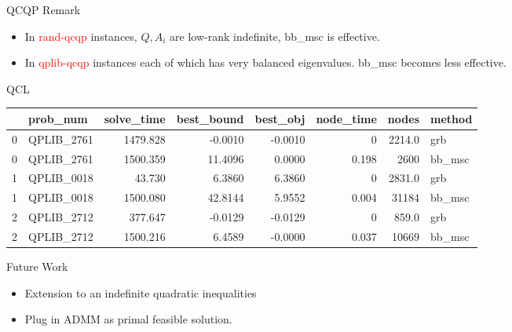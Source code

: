 \documentclass[aspectratio=1610, 9pt]{beamer}
\newcommand{\redsf}[1]{\textcolor{red}{\textsf{#1}}}
\begin{document}
\begin{frame}[standout]{QCQP}
  \normalsize
  Remark
  \begin{itemize}
    \item In \redsf{rand-qcqp} instances, \(Q, A_i\) are low-rank indefinite, bb\_msc is effective.
    \item In \redsf{qplib-qcqp} instances each of which has very balanced eigenvalues. bb\_msc becomes less effective.
  \end{itemize}
\end{frame}

\begin{frame}[standout]{QCL}
  \begin{tabular}{llrrrrrl}
    \toprule
    {} & prob\_num   & solve\_time & best\_bound & best\_obj & node\_time & nodes  & method  \\
    \midrule
    0  & QPLIB\_2761 & 1479.828    & -0.0010     & -0.0010   & 0          & 2214.0 & grb     \\
    0  & QPLIB\_2761 & 1500.359    & 11.4096     & 0.0000    & 0.198      & 2600   & bb\_msc \\
    1  & QPLIB\_0018 & 43.730      & 6.3860      & 6.3860    & 0          & 2831.0 & grb     \\
    1  & QPLIB\_0018 & 1500.080    & 42.8144     & 5.9552    & 0.004      & 31184  & bb\_msc \\
    2  & QPLIB\_2712 & 377.647     & -0.0129     & -0.0129   & 0          & 859.0  & grb     \\
    2  & QPLIB\_2712 & 1500.216    & 6.4589      & -0.0000   & 0.037      & 10669  & bb\_msc \\
    \bottomrule
  \end{tabular}
\end{frame}


\setlength\pdfpagewidth{16.00cm}%
\setlength\pdfpageheight{10.00cm}%

\begin{frame}[allowframebreaks]{Future Work}
  \begin{itemize}
    \item Extension to an indefinite quadratic inequalities
    \item Plug in ADMM as primal feasible solution.
  \end{itemize}
\end{frame}
\end{document}
